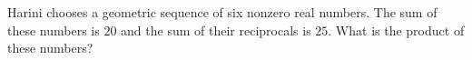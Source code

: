 Harini chooses a geometric sequence of six nonzero real numbers. The sum of these numbers is $20$ and the sum of their reciprocals is $25$. What is the product of these numbers?
